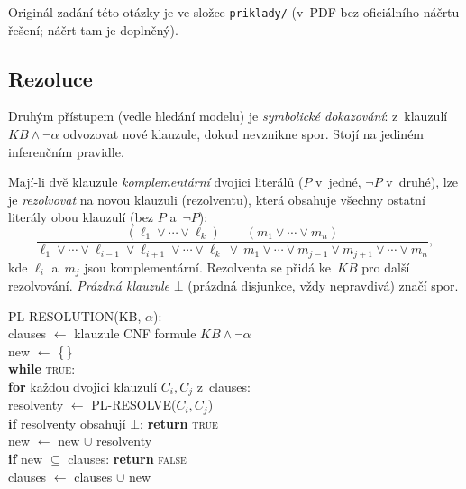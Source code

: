 \noindent Originál zadání této otázky je ve složce \texttt{priklady/} (v~PDF bez oficiálního náčrtu řešení; náčrt tam je doplněný).

\subsection{Rezoluce}

Druhým přístupem (vedle hledání modelu) je \emph{symbolické dokazování}: z~klauzulí $KB\wedge\neg\alpha$ odvozovat nové klauzule, dokud nevznikne spor. Stojí na jediném inferenčním pravidle.

\begin{definice}
Mají-li dvě klauzule \emph{komplementární} dvojici literálů ($P$ v~jedné, $\neg P$ v~druhé), lze je \emph{rezolvovat} na novou klauzuli (rezolventu), která obsahuje všechny ostatní literály obou klauzulí (bez $P$ a~$\neg P$):
\[
\frac{(\ell_1\vee\cdots\vee \ell_k)\qquad (m_1\vee\cdots\vee m_n)}{\ell_1\vee\cdots\vee\ell_{i-1}\vee\ell_{i+1}\vee\cdots\vee\ell_k\ \vee\ m_1\vee\cdots\vee m_{j-1}\vee m_{j+1}\vee\cdots\vee m_n},
\]
kde $\ell_i$ a~$m_j$ jsou komplementární. Rezolventa se přidá ke~$KB$ pro další rezolvování. \emph{Prázdná klauzule} $\bot$ (prázdná disjunkce, vždy nepravdivá) značí spor.
\end{definice}

\begin{algo}
\ttfamily\small
PL-RESOLUTION(KB, $\alpha$):\\
\hspace*{1.5em}clauses $\leftarrow$ klauzule CNF formule $KB\wedge\neg\alpha$ \\
\hspace*{1.5em}new $\leftarrow$ \{\,\}\\
\hspace*{1.5em}\textbf{while} \textsc{true}:\\
\hspace*{3em}\textbf{for} každou dvojici klauzulí $C_i, C_j$ z~clauses:\\
\hspace*{4.5em}resolventy $\leftarrow$ PL-RESOLVE($C_i, C_j$) \\
\hspace*{4.5em}\textbf{if} resolventy obsahují $\bot$: \textbf{return} \textsc{true} \\
\hspace*{4.5em}new $\leftarrow$ new $\cup$ resolventy\\
\hspace*{3em}\textbf{if} new $\subseteq$ clauses: \textbf{return} \textsc{false} \\
\hspace*{3em}clauses $\leftarrow$ clauses $\cup$ new
\end{algo}

